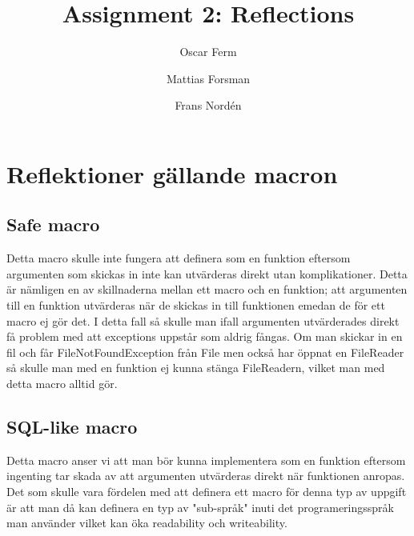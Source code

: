 \documentclass[a5paper,10pt,oneside]{article}
\title{Assignment 2: Reflections}
\author{Oscar Ferm \and Mattias Forsman \and Frans Nordén}
\begin{document}
\maketitle
\pagebreak

\section{Reflektioner gällande macron}

\subsection{Safe macro}
Detta macro skulle inte fungera att definera som en funktion eftersom argumenten som skickas in inte kan utvärderas direkt utan 
komplikationer. Detta är nämligen en av skillnaderna mellan ett macro och en funktion; att argumenten till en funktion utvärderas när
de skickas in till funktionen emedan de för ett macro ej gör det. I detta fall så skulle man ifall argumenten utvärderades direkt 
få problem med att exceptions uppstår som aldrig fångas. Om man skickar in en fil och får FileNotFoundException från File men också 
har öppnat en FileReader så skulle man med en funktion ej kunna stänga FileReadern, vilket man med detta macro alltid gör.

\subsection{SQL-like macro}
Detta macro anser vi att man bör kunna implementera som en funktion eftersom ingenting tar skada av att argumenten utvärderas direkt när funktionen
anropas. Det som skulle vara fördelen med att definera ett macro för denna typ av uppgift är att man då kan definera en typ av "sub-språk" inuti det programeringsspråk man använder vilket kan öka readability och writeability. 

% 
\end{document}
